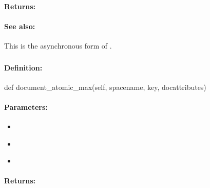 \paragraph{Returns:}


\paragraph{See also:}  This is the asynchronous form of .

\pagebreak
\subsubsection{}
\label{api:python:document_atomic_max}


\paragraph{Definition:}
\begin{pythoncode}
def document_atomic_max(self, spacename, key, docattributes)
\end{pythoncode}

\paragraph{Parameters:}
\begin{itemize}[noitemsep]
\item {}\\

\item {}\\

\item {}\\

\end{itemize}

\paragraph{Returns:}


\pagebreak
\subsubsection{}
\label{api:python:async_document_atomic_max}


